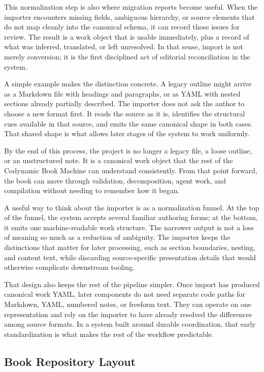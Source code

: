 \documentclass[11pt]{article}
\begin{document}
This normalization step is also where migration reports become useful. When the importer encounters missing fields, ambiguous hierarchy, or source elements that do not map cleanly into the canonical schema, it can record those issues for review. The result is a work object that is usable immediately, plus a record of what was inferred, translated, or left unresolved. In that sense, import is not merely conversion; it is the first disciplined act of editorial reconciliation in the system.

A simple example makes the distinction concrete. A legacy outline might arrive as a Markdown file with headings and paragraphs, or as YAML with nested sections already partially described. The importer does not ask the author to choose a new format first. It reads the source as it is, identifies the structural cues available in that source, and emits the same canonical shape in both cases. That shared shape is what allows later stages of the system to work uniformly.

By the end of this process, the project is no longer a legacy file, a loose outline, or an unstructured note. It is a canonical work object that the rest of the Codynamic Book Machine can understand consistently. From that point forward, the book can move through validation, decomposition, agent work, and compilation without needing to remember how it began.

A useful way to think about the importer is as a normalization funnel. At the top of the funnel, the system accepts several familiar authoring forms; at the bottom, it emits one machine-readable work structure. The narrower output is not a loss of meaning so much as a reduction of ambiguity. The importer keeps the distinctions that matter for later processing, such as section boundaries, nesting, and content text, while discarding source-specific presentation details that would otherwise complicate downstream tooling.

That design also keeps the rest of the pipeline simpler. Once import has produced canonical work YAML, later components do not need separate code paths for Markdown, YAML, numbered notes, or freeform text. They can operate on one representation and rely on the importer to have already resolved the differences among source formats. In a system built around durable coordination, that early standardization is what makes the rest of the workflow predictable.



\subsection{Book Repository Layout}
\end{document}
